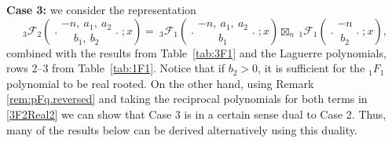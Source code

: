 \documentclass[reqno,11pt]{amsart}
\theoremstyle{remark}
\newcommand*\pFq[5]{%
 {\ }_{#1}{\mathcal F}_{#2}{\left(\genfrac..{0pt}{}{#3}{#4};#5\right)}%
}
\begin{document}
\medskip

\textbf{Case 3: }  
we consider the representation 
\begin{equation} \label{3F2Real1times1F1}
    \pFq{3}{2}{-n,\ a_1,\ a_2}{b_1,\ b_2}{x}=\pFq{3}{1}{-n,\ a_1, \ a_2}{b_1}{x} \boxtimes_n \pFq{1}{1}{-n }{b_2 }{x},
\end{equation}
combined with the results from Table~\ref{tab:3F1} and the Laguerre polynomials, rows 2--3 from Table~\ref{tab:1F1}. Notice that if $b_2>0$, it is sufficient for the ${}_1F_1$ polynomial to be real rooted. On the other hand, using Remark \ref{rem:pFq.reversed} and taking the reciprocal polynomials for both terms in \eqref{3F2Real2} we can show that Case 3 is in a certain sense dual to Case 2. Thus, many of the results below can be derived alternatively using this duality. 
\end{document}
